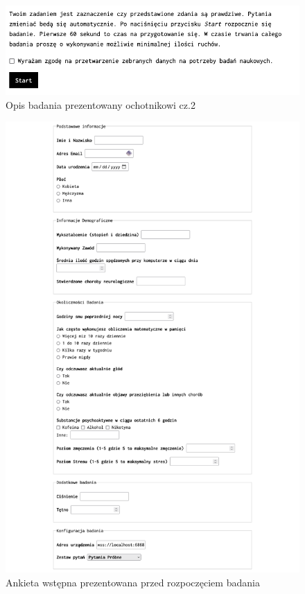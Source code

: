 \documentclass{./assets/wfis}
\begin{document}
\begin{figure}[h!]
    \centering
    \includegraphics[width=\columnwidth]{thesis/assets/description_1.png}
    \caption{Opis badania prezentowany ochotnikowi cz.2}
    \label{zgoda-na-przetwarzanie-danych}
\end{figure}


\begin{figure}[h!]
    \centering
    \includegraphics[width=\columnwidth]{thesis/assets/ankieta_wejsciowa.png}
    \caption{Ankieta wstępna prezentowana przed rozpoczęciem badania}
    \label{pytania-ankiety-wejsciowej}
\end{figure}
\end{document}
